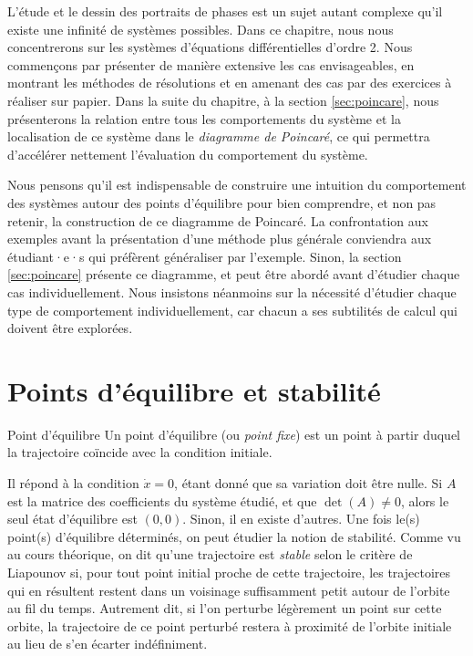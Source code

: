         L'étude et le dessin des portraits de phases est un sujet autant complexe qu'il existe une infinité de systèmes possibles. Dans ce chapitre, nous nous concentrerons sur les systèmes d'équations différentielles d'ordre 2. Nous commençons par présenter de manière extensive les cas envisageables, en montrant les méthodes de résolutions et en amenant des cas par des exercices à réaliser sur papier. Dans la suite du chapitre, à la section \ref{sec:poincare}, nous présenterons la relation entre tous les comportements du système et la localisation de ce système dans le \textit{diagramme de Poincaré}, ce qui permettra d'accélérer nettement l'évaluation du comportement du système. 

        Nous pensons qu'il est indispensable de construire une intuition du comportement des systèmes autour des points d'équilibre pour bien comprendre, et non pas retenir, la construction de ce diagramme de Poincaré. La confrontation aux exemples avant la présentation d'une méthode plus générale conviendra aux étudiant·e·s qui préfèrent généraliser par l'exemple. Sinon, la section \ref{sec:poincare} présente ce diagramme, et peut être abordé avant d'étudier chaque cas individuellement. Nous insistons néanmoins sur la nécessité d'étudier chaque type de comportement individuellement, car chacun a ses subtilités de calcul qui doivent être explorées.
    
    \section{Points d'équilibre et stabilité}
        \begin{definition}{Point d'équilibre}
            Un point d'équilibre (ou \textit{point fixe}) est un point à partir duquel la trajectoire coïncide avec la condition initiale.
        \end{definition}
         Il répond à la condition $\dot{x} = 0$, étant donné que sa variation doit être nulle. Si $A$ est la matrice des coefficients du système étudié, et que $\det(A) \neq 0$, alors le seul état d'équilibre est $(0, 0)$.  Sinon, il en existe d'autres.
         Une fois le(s) point(s) d'équilibre déterminés, on peut étudier la notion de stabilité. Comme vu au cours théorique, on dit qu'une trajectoire est \textit{stable} selon le critère de Liapounov si, pour tout point initial proche de cette trajectoire, les trajectoires qui en résultent restent dans un voisinage suffisamment petit autour de l'orbite au fil du temps. Autrement dit, si l'on perturbe légèrement un point sur cette orbite, la trajectoire de ce point perturbé restera à proximité de l'orbite initiale au lieu de s'en écarter indéfiniment. 

